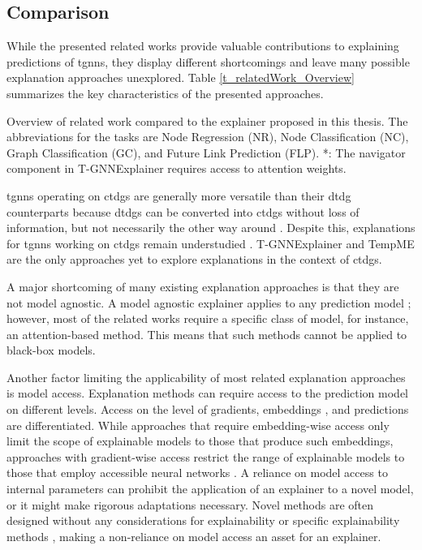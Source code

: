 \subsection{Comparison}
\label{s_relateWork_comparison}

While the presented related works provide valuable contributions to explaining predictions of \glspl{tgnn}, they display different shortcomings and leave many possible explanation approaches unexplored. Table \ref{t_relatedWork_Overview} summarizes the key characteristics of the presented approaches. 

\begin{table}[ht]
    \centering
    \footnotesize
    
    \caption{Overview of related work compared to the explainer proposed in this thesis. The abbreviations for the tasks are Node Regression (NR), Node Classification (NC), Graph Classification (GC), and Future Link Prediction (FLP). *: The navigator component in T-GNNExplainer requires access to attention weights.}
    \label{t_relatedWork_Overview}
\end{table}

\glspl{tgnn} operating on \glspl{ctdg} are generally more versatile than their \gls{dtdg} counterparts because \glspl{dtdg} can be converted into \glspl{ctdg} without loss of information, but not necessarily the other way around \cite{souza_provably_2022}. Despite this, explanations for \glspl{tgnn} working on \glspl{ctdg} remain understudied \cite{chen_tempme_2023}. T-GNNExplainer \cite{xia_explaining_2023} and TempME \cite{chen_tempme_2023} are the only approaches yet to explore explanations in the context of \glspl{ctdg}.

A major shortcoming of many existing explanation approaches is that they are not model agnostic. A model agnostic explainer applies to any prediction model \cite{prado-romero_survey_2023}; however, most of the related works require a specific class of model, for instance, an attention-based method. This means that such methods cannot be applied to black-box models.

Another factor limiting the applicability of most related explanation approaches is model access. Explanation methods can require access to the prediction model on different levels. Access on the level of gradients, embeddings \cite{verma_counterfactual_2020}, and predictions are differentiated. While approaches that require embedding-wise access only limit the scope of explainable models to those that produce such embeddings, approaches with gradient-wise access restrict the range of explainable models to those that employ accessible neural networks \cite{prado-romero_survey_2023}. A reliance on model access to internal parameters can prohibit the application of an explainer to a novel model, or it might make rigorous adaptations necessary. Novel methods are often designed without any considerations for explainability or specific explainability methods \cite{xia_explaining_2023}, making a non-reliance on model access an asset for an explainer.

